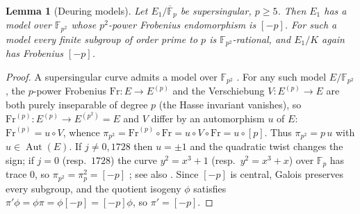 \documentclass[11pt,a4paper]{article}
\numberwithin{equation}{section}
\newtheorem{lemma}[theorem]{Lemma}
\theoremstyle{definition}
\theoremstyle{remark}
\newcommand{\Fp}{\mathbb F_p}
\newcommand{\Fq}{\mathbb F_{p^2}}
\newcommand{\Fb}{\overline{\mathbb F}_p}
\newcommand{\Aut}{\operatorname{Aut}}
\begin{document}
\begin{lemma}[Deuring models]\label{lem:deuring}
Let $E_1/\Fb$ be supersingular, $p\ge5$. Then $E_1$ has a model over $\Fq$ whose $p^2$-power
Frobenius endomorphism is $[-p]$. For such a model every finite subgroup of order prime to $p$ is
$\Fq$-rational, and $E_1/K$ again has Frobenius $[-p]$.
\end{lemma}
\begin{proof}
A supersingular curve admits a model over $\Fq$
\citep{Deuring41,Waterhouse69}. For any such model $E/\Fq$, the $p$-power Frobenius $\mathrm{Fr}:E\to E^{(p)}$ and the
Verschiebung $V:E^{(p)}\to E$ are both purely inseparable of degree $p$ (the Hasse invariant
vanishes), so $\mathrm{Fr}^{(p)}:E^{(p)}\to E^{(p^2)}=E$ and $V$ differ by an automorphism $u$ of $E$:
$\mathrm{Fr}^{(p)}=u\circ V$, whence
$\pi_{p^2}=\mathrm{Fr}^{(p)}\circ\mathrm{Fr}=u\circ V\circ\mathrm{Fr}=u\circ[p]$. Thus
$\pi_{p^2}=p\,u$ with $u\in\Aut(E)$. If $j\ne0,1728$ then $u=\pm1$ and the quadratic twist changes
the sign; if $j=0$ (resp.\ $1728$) the curve $y^2=x^3+1$ (resp.\ $y^2=x^3+x$) over $\Fp$ has
trace $0$, so $\pi_{p^2}=\pi_p^2=[-p]$ \citep{Deuring41,Waterhouse69}; see also
\citet[Lemma~4.3]{Ono25}. Since $[-p]$ is central, Galois preserves every subgroup, and the quotient
isogeny $\phi$ satisfies $\pi'\phi=\phi\pi=\phi[-p]=[-p]\phi$, so $\pi'=[-p]$.
\end{proof}
\end{document}
